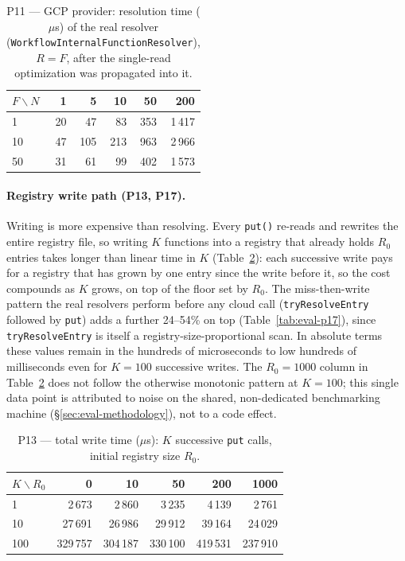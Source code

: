 \begin{table}[htbp]
  \centering
  \caption{P11 --- GCP provider: resolution time ($\mu$s) of the real resolver
  (\texttt{Workflow\allowbreak Internal\allowbreak Function\allowbreak Resolver}), $R{=}F$, after
  the single-read optimization was propagated into it.}
  \label{tab:eval-p11}
  \begin{tabular}{lrrrrr}
    \hline
    $F\backslash N$ & 1 & 5 & 10 & 50 & 200 \\
    \hline
    1  & 20 & 47  & 83  & 353 & 1\,417 \\
    10 & 47 & 105 & 213 & 963 & 2\,966 \\
    50 & 31 & 61  & 99  & 402 & 1\,573 \\
    \hline
  \end{tabular}
\end{table}

\paragraph{Registry write path (P13, P17).}
Writing is more expensive than resolving. Every \texttt{put()} re-reads and rewrites the entire
registry file, so writing $K$ functions into a registry that already holds $R_0$ entries takes
longer than linear time in $K$ (Table~\ref{tab:eval-p13}): each successive write pays for a
registry that has grown by one entry since the write before it, so the cost compounds as $K$
grows, on top of the floor set by $R_0$. The miss-then-write pattern the real resolvers perform
before any cloud call (\texttt{tryResolveEntry} followed by \texttt{put}) adds a further
24--54\% on top (Table~\ref{tab:eval-p17}), since \texttt{tryResolveEntry} is itself a
registry-size-proportional scan. In absolute terms these values remain
in the hundreds of microseconds to low hundreds of milliseconds even for $K{=}100$ successive
writes. The $R_0{=}1000$ column in Table~\ref{tab:eval-p13} does not follow the otherwise
monotonic pattern at $K{=}100$; this single data point is attributed to noise on the shared,
non-dedicated benchmarking machine (\S\ref{sec:eval-methodology}), not to a code effect.

\begin{table}[htbp]
  \centering
  \caption{P13 --- total write time ($\mu$s): $K$ successive \texttt{put} calls, initial registry
  size $R_0$.}
  \label{tab:eval-p13}
  \begin{tabular}{lrrrrr}
    \hline
    $K\backslash R_0$ & 0 & 10 & 50 & 200 & 1000 \\
    \hline
    1   & 2\,673   & 2\,860   & 3\,235   & 4\,139   & 2\,761   \\
    10  & 27\,691  & 26\,986  & 29\,912  & 39\,164  & 24\,029  \\
    100 & 329\,757 & 304\,187 & 330\,100 & 419\,531 & 237\,910 \\
    \hline
  \end{tabular}
\end{table}

